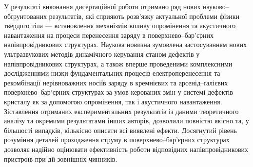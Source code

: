 {\noveltyTXT}
У результаті виконання дисертаційної роботи отримано ряд нових науково--обґрунтованих
результатів, які
сприяють розв'язку актуальної проблеми фізики твердого тіла ---
встановлення механізмів впливу опромінення та акустичного навантаження на процеси перенесення заряду в поверхнево--бар'єрних напівпровідникових структурах.
Наукова новизна зумовлена застосуванням нових ультразвукових методів динамічного керування станом дефектів у напівпровідникових структурах, а також вперше проведеними комплексними дослідженнями низки фундаментальних процесів електроперенесення та рекомбінації нерівноважних носіїв заряду в кремнієвих та арсенід--ґалієвих  поверхнево--бар'єрних структурах за умов керованих змін у системі дефектів кристалу як за допомогою опромінення, так і акустичного навантаження.
Зіставлення отриманих експериментальних результатів із даними теоретичного аналізу та окремими результатами інших авторів, дозволили повністю якісно та, у більшості випадків, кількісно описати всі виявлені ефекти.
Досягнутий рівень розуміння деталей проходження струму в поверхнево--бар'єрних структурах дозволяє надійно оцінювати ефективність роботи відповідних  напівпровідникових пристроїв при дії зовнішніх чинників.

